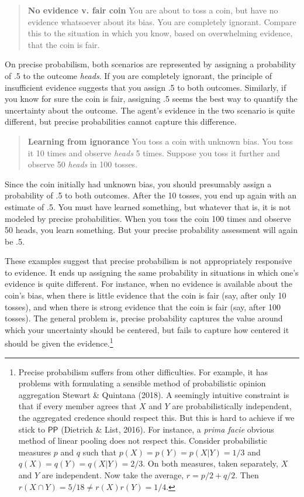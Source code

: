 \documentclass[
  10pt,
  dvipsnames,enabledeprecatedfontcommands]{scrartcl}
\newcommand{\s}[1]{\mbox{$\mathsf{#1}$}}
\begin{document}
\begin{quote}
\textbf{No evidence v. fair coin}
You are about to toss a coin, but have no evidence 
whatsoever about its bias. You are completely ignorant. 
Compare this to the situation in which you know, 
based on overwhelming evidence, that the coin is fair. 
\end{quote}

\noindent On precise probabilism, both scenarios are represented by
assigning a probability of .5 to the outcome \emph{heads}. If you are
completely ignorant, the principle of insufficient evidence suggests
that you assign .5 to both outcomes. Similarly, if you know for sure the
coin is fair, assigning .5 seems the best way to quantify the
uncertainty about the outcome. The agent's evidence in the two scenario
is quite different, but precise probabilities cannot capture this
difference.

\begin{quote}
\textbf{Learning from ignorance}
You toss a coin with unknown bias. You toss it 10 times and observe \emph{heads} 5 times. Suppose you toss it further and observe 50 \emph{heads} in 100 tosses. 
\end{quote}

\noindent Since the coin initially had unknown bias, you should
presumably assign a probability of .5 to both outcomes. After the 10
tosses, you end up again with an estimate of .5. You must have learned
something, but whatever that is, it is not modeled by precise
probabilities. When you toss the coin 100 times and observe 50 heads,
you learn something. But your precise probability assessment will again
be .5.

These examples suggest that precise probabilism is not appropriately
responsive to evidence. It ends up assigning the same probability in
situations in which one's evidence is quite different. For instance,
when no evidence is available about the coin's bias, when there is
little evidence that the coin is fair (say, after only 10 tosses), and
when there is strong evidence that the coin is fair (say, after 100
tosses). The general problem is, precise probability captures the value
around which your uncertainty should be centered, but fails to capture
how centered it should be given the evidence.\footnote{Precise
  probabilism suffers from other difficulties. For example, it has
  problems with formulating a sensible method of probabilistic opinion
  aggregation Stewart \& Quintana (2018). A seemingly intuitive
  constraint is that if every member agrees that \(X\) and \(Y\) are
  probabilistically independent, the aggregated credence should respect
  this. But this is hard to achieve if we stick to \s{PP} (Dietrich \&
  List, 2016). For instance, a \emph{prima facie} obvious method of
  linear pooling does not respect this. Consider probabilistic measures
  \(p\) and \(q\) such that \(p(X) = p(Y) = p(X\vert Y) = 1/3\) and
  \(q(X) = q(Y) = q(X\vert Y) = 2/3\). On both measures, taken
  separately, \(X\) and \(Y\) are independent. Now take the average,
  \(r=p/2+q/2\). Then \(r(X\cap Y) = 5/18 \neq r(X)r(Y)=1/4\).}
\end{document}

